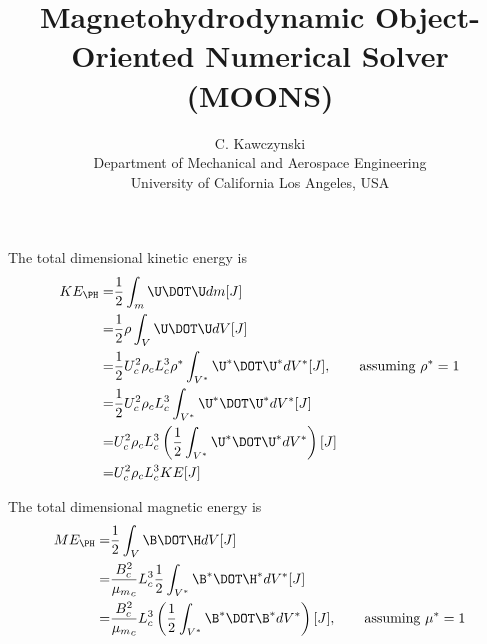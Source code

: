 \documentclass[11pt]{article}
\begin{document}
\doublespacing
\title{Magnetohydrodynamic Object-Oriented Numerical Solver (MOONS)}
\author{C. Kawczynski \\
Department of Mechanical and Aerospace Engineering \\
University of California Los Angeles, USA\\
}
\maketitle

The total dimensional kinetic energy is
\begin{equation}\begin{aligned}
KE_{\PH} =& \frac{1}{2} \int_m \U \DOT \U dm [J] \\
         =& \frac{1}{2} \rho \int_V \U \DOT \U dV [J] \\
         =& \frac{1}{2} U_c^2 \rho_c L_c^3 \rho^* \int_{V^*} \U^* \DOT \U^* dV^* [J], \qquad \text{assuming $\rho^*=1$} \\
         =& \frac{1}{2} U_c^2 \rho_c L_c^3        \int_{V^*} \U^* \DOT \U^* dV^* [J] \\
         =& U_c^2 \rho_c L_c^3 \left( \frac{1}{2} \int_{V^*} \U^* \DOT \U^* dV^* \right) [J] \\
         =& U_c^2 \rho_c L_c^3 KE [J] \\
\end{aligned}\end{equation}

The total dimensional magnetic energy is
\begin{equation}\begin{aligned}
ME_{\PH} =& \frac{1}{2} \int_V \B \DOT \H dV [J] \\
         =& \frac{B_c^2}{{\mu_m}_c} L_c^3 \frac{1}{2} \int_{V^*} \B^* \DOT \H^* dV^* [J] \\
         =& \frac{B_c^2}{{\mu_m}_c} L_c^3 \left( \frac{1}{2} \int_{V^*} \B^* \DOT \B^* dV^* \right) [J], \qquad \text{assuming $\mu^*=1$} \\
\end{aligned}\end{equation}
\end{document}
